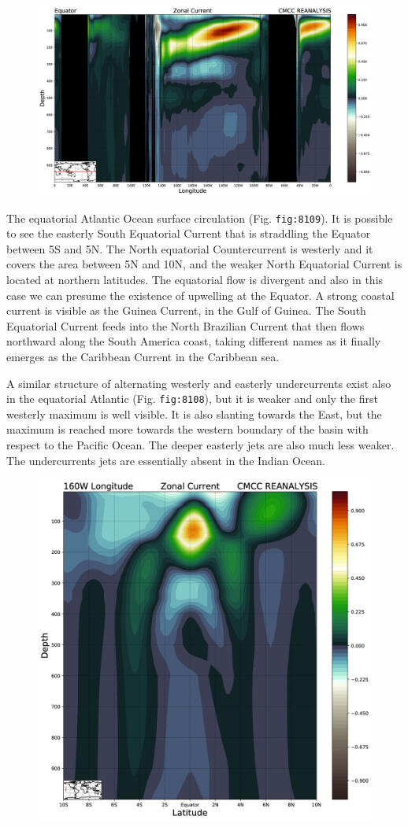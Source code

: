 \begin{figure}
	\centering
	\includegraphics[width = .7 \textwidth]{figs/GD/SectZonal_CurrentEquator1000.png}
	\caption{} \label{fig:}
\end{figure}

The equatorial Atlantic Ocean surface circulation (Fig.
\texttt{fig:8109}). It is possible to see the easterly South Equatorial
Current that is straddling the Equator between 5S and 5N. The North
equatorial Countercurrent is westerly and it covers the area between 5N
and 10N, and the weaker North Equatorial Current is located at northern
latitudes. The equatorial flow is divergent and also in this case we can
presume the existence of upwelling at the Equator. A strong coastal
current is visible as the Guinea Current, in the Gulf of Guinea. The
South Equatorial Current feeds into the North Brazilian Current that
then flows northward along the South America coast, taking different
names as it finally emerges as the Caribbean Current in the Caribbean
sea.

A similar structure of alternating westerly and easterly undercurrents
exist also in the equatorial Atlantic (Fig. \texttt{fig:8108}), but it
is weaker and only the first westerly maximum is well visible. It is
also slanting towards the East, but the maximum is reached more towards
the western boundary of the basin with respect to the Pacific Ocean. The
deeper easterly jets are also much less weaker. The undercurrents jets
are essentially absent in the Indian Ocean.

\begin{figure}
	\centering
	\includegraphics[width = .7 \textwidth]{figs/GD/SectZonal_Current160W1000.png}
	\caption{} \label{fig:}
\end{figure}


